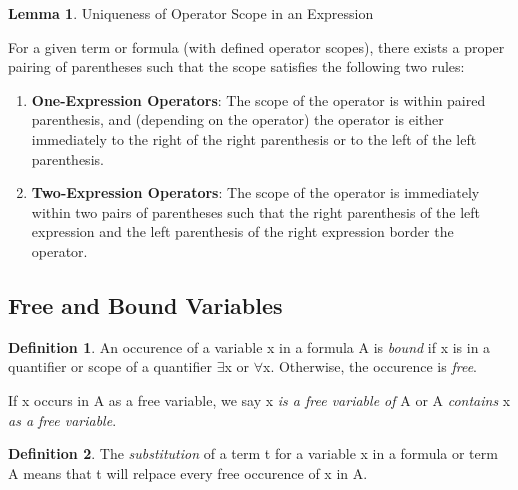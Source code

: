 \documentclass{article}
\theoremstyle{definition}
\newtheorem{definition}{Definition}
\newtheorem{lemma}{Lemma}
\begin{document}
\setcounter{lemma}{3}

\begin{lemma}{Uniqueness of Operator Scope in an Expression}

    For a given term or formula (with defined operator scopes), there exists a proper pairing of parentheses such that the scope satisfies the following two rules:
    \begin{enumerate}[label=(\alph*)]
        \item \textbf{One-Expression Operators}: The scope of the operator is within paired parenthesis, and (depending on the operator) the operator is either immediately to the right of the right parenthesis or to the left of the left parenthesis.
        \item \textbf{Two-Expression Operators}: The scope of the operator is immediately within two pairs of parentheses such that the right parenthesis of the left expression and the left parenthesis of the right expression border the operator.
    \end{enumerate}
\end{lemma}

\subsection{Free and Bound Variables}

\begin{definition}
    An occurence of a variable x in a formula A is \emph{bound} if x is in a quantifier or scope of a quantifier $\exists$x or $\forall$x. Otherwise, the occurence is \emph{free}.

    If x occurs in A as a free variable, we say x \emph{is a free variable of} A or A \emph{contains} x \emph{as a free variable}.
\end{definition}

\begin{definition}
    The \emph{substitution} of a term t for a variable x in a formula or term A means that t will relpace every free occurence of x in A.
\end{definition}
\end{document}
